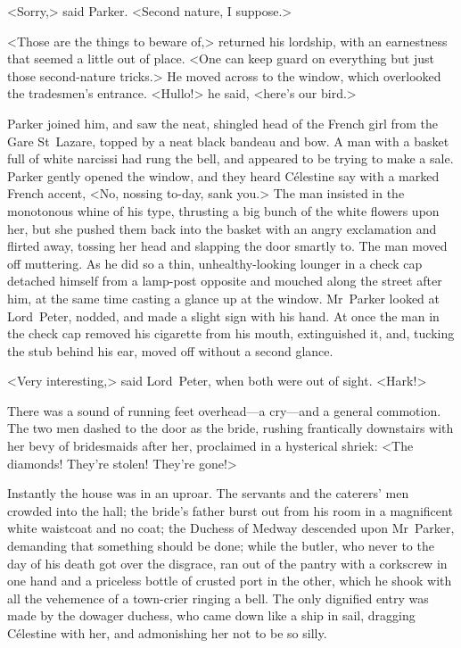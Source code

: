 <Sorry,> said Parker. <Second nature, I suppose.>

<Those are the things to beware of,> returned his lordship, with an earnestness that seemed a little out of place. <One can keep guard on everything but just those second-nature tricks.> He moved across to the window, which overlooked the tradesmen's entrance. <Hullo!> he said, <here's our bird.>

Parker joined him, and saw the neat, shingled head of the French girl from the Gare St~Lazare, topped by a neat black bandeau and bow. A man with a basket full of white narcissi had rung the bell, and appeared to be trying to make a sale. Parker gently opened the window, and they heard Célestine say with a marked French accent, <No, nossing to-day, sank you.> The man insisted in the monotonous whine of his type, thrusting a big bunch of the white flowers upon her, but she pushed them back into the basket with an angry exclamation and flirted away, tossing her head and slapping the door smartly to. The man moved off muttering. As he did so a thin, unhealthy-looking lounger in a check cap detached himself from a lamp-post opposite and mouched along the street after him, at the same time casting a glance up at the window. Mr~Parker looked at Lord~Peter, nodded, and made a slight sign with his hand. At once the man in the check cap removed his cigarette from his mouth, extinguished it, and, tucking the stub behind his ear, moved off without a second glance.

<Very interesting,> said Lord~Peter, when both were out of sight. <Hark!>

There was a sound of running feet overhead—a cry—and a general commotion. The two men dashed to the door as the bride, rushing frantically downstairs with her bevy of bridesmaids after her, proclaimed in a hysterical shriek: <The diamonds! They're stolen! They're gone!>

Instantly the house was in an uproar. The servants and the caterers' men crowded into the hall; the bride's father burst out from his room in a magnificent white waistcoat and no coat; the Duchess of Medway descended upon Mr~Parker, demanding that something should be done; while the butler, who never to the day of his death got over the disgrace, ran out of the pantry with a corkscrew in one hand and a priceless bottle of crusted port in the other, which he shook with all the vehemence of a town-crier ringing a bell. The only dignified entry was made by the dowager duchess, who came down like a ship in sail, dragging Célestine with her, and admonishing her not to be so silly.

